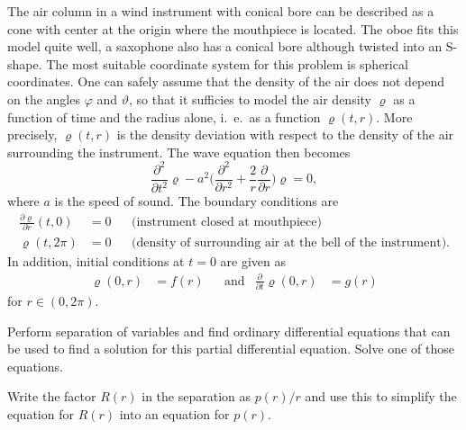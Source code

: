 The air column in a wind instrument with conical bore can be described
as a cone with center at the origin where the mouthpiece is located.
The oboe fits this model quite well, a saxophone also has a conical bore
although twisted into an S-shape.
The most suitable coordinate system for this problem is spherical coordinates.
One can safely assume that the density of the air does not depend on the angles
$\varphi$ and $\vartheta$, so that it sufficies to model the air
density $\varrho$ as a function of time and the radius alone, i.~e.~as
a function $\varrho(t,r)$.
More precisely, $\varrho(t,r)$ is the density deviation with respect 
to the density of the air surrounding the instrument.
The wave equation then becomes
\begin{equation}
\frac{\partial^2}{\partial t^2}\varrho
-
a^2\biggl(
\frac{\partial^2}{\partial r^2}
+\frac2r\frac{\partial}{\partial r}
\biggr)\varrho
=
0,
\label{40000020:equation}
\end{equation}
where $a$ is the speed of sound.
The boundary conditions are 
\begin{align*}
\frac{\partial\varrho}{\partial r}(t,0)&=0&&\text{(instrument closed at mouthpiece)}
\\
\varrho(t,2\pi)&=0&&\text{(density of surrounding air at the bell of the instrument)}.
\end{align*}
In addition, initial conditions at $t=0$ are given as
\[
\begin{aligned}
\varrho(0,r) &= f(r)
&
&\text{and}&
\frac{\partial}{\partial t} \varrho(0,r) &= g(r)
\end{aligned}
\]
for $r\in(0,2\pi)$.

\begin{teilaufgaben}
\item
Perform separation of variables and find ordinary differential equations
that can be used to find a solution for this partial differential equation.
Solve one of those equations.
\item
Write the factor $R(r)$ in the separation as $p(r)/r$ and use this
to simplify the equation for $R(r)$ into an equation for $p(r)$.
\end{teilaufgaben}

